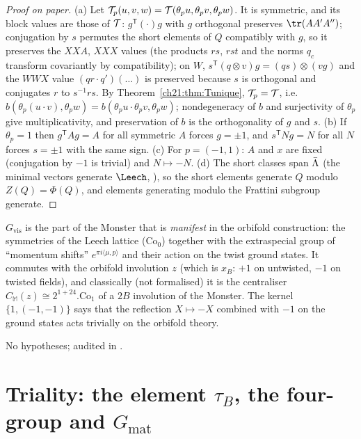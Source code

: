 \begin{proof}[Proof on paper]
(a) Let $\mathcal{T}_p(u,v,w)=\mathcal{T}(\theta_pu,\theta_pv,\theta_pw)$.  It is symmetric, and its block values are
those of $\mathcal{T}$: $g^{\mathsf T}(\cdot)g$ with $g$ orthogonal preserves $\tr(AA'A'')$; conjugation by $s$
permutes the short elements of $Q$ compatibly with $g$, so it preserves the $XXA$, $XXX$ values (the
products $rs$, $rst$ and the norms $q_c$ transform covariantly by compatibility); on $W$,
$s^{\mathsf T}(q\otimes v)g=(qs)\otimes(vg)$ and the $WWX$ value
$(qr\cdot q')(\dots)$ is preserved because $s$ is orthogonal and conjugates $r$ to $s^{-1}rs$.  By
Theorem~\ref{ch21:thm:Tunique}, $\mathcal{T}_p=\mathcal{T}$, i.e.\ $b(\theta_p(u\cdot v),\theta_pw)=b(\theta_pu\cdot\theta_pv,\theta_pw)$;
nondegeneracy of $b$ and surjectivity of $\theta_p$ give multiplicativity, and preservation of $b$ is
the orthogonality of $g$ and $s$.  (b) If $\theta_p=1$ then $g^{\mathsf T}Ag=A$ for all symmetric $A$
forces $g=\pm1$, and $s^{\mathsf T}Ng=N$ for all $N$ forces $s=\pm1$ with the same sign.  (c) For
$p=(-1,1)$: $A$ and $x$ are fixed (conjugation by $-1$ is trivial) and $N\mapsto-N$.  (d) The short
classes span $\bar{\Lambda}$ (the minimal vectors generate $\Leech$, ), so the
short elements generate $Q$ modulo $Z(Q)=\Phi(Q)$, and elements generating modulo the Frattini subgroup
generate.
\end{proof}
\begin{physics}
$G_{\mathrm{vis}}$ is the part of the Monster that is \emph{manifest} in the orbifold construction:
the symmetries of the Leech lattice ($\mathrm{Co}_0$) together with the extraspecial group of
``momentum shifts'' $e^{\pi i\langle\mu,p\rangle}$ and their action on the twist ground states.  It
commutes with the orbifold involution $z$ (which is $x_B$: $+1$ on untwisted, $-1$ on twisted
fields), and classically (not formalised) it is the centraliser $C_{\mathbb M}(z)\cong2^{1+24}.\mathrm{Co}_1$
of a $2B$ involution of the Monster.  The kernel $\{1,(-1,-1)\}$ says that the reflection $X\mapsto-X$ combined with
$-1$ on the ground states acts trivially on the orbifold theory.
\end{physics}
\begin{status}
No hypotheses; audited in .
\end{status}

\section{Triality: the element \texorpdfstring{$\tau_B$}{tauB}, the four-group and \texorpdfstring{$G_{\mathrm{mat}}$}{Gmat}}\label{ch21:sec:triality}

